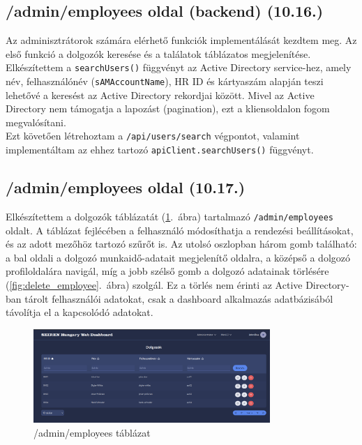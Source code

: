 \documentclass[a4paper]{article}
\newcommand{\inltxt}[1]{\texttt{#1}}
\begin{document}
\subsection{/admin/employees oldal (backend) (10.16.)}

Az adminisztrátorok számára elérhető funkciók implementálását kezdtem meg. Az első funkció a
dolgozók keresése és a találatok táblázatos megjelenítése. Elkészítettem a \inltxt{searchUsers()}
függvényt az Active Directory service-hez, amely név, felhasználónév (\inltxt{sAMAccountName}), HR ID és
kártyaszám alapján teszi lehetővé a keresést az Active Directory rekordjai között. Mivel az Active
Directory nem támogatja a lapozást (pagination), ezt a kliensoldalon fogom megvalósítani.\\

Ezt követően létrehoztam a \inltxt{/api/users/search} végpontot, valamint implementáltam az ehhez
tartozó \inltxt{apiClient.searchUsers()} függvényt.


\subsection{/admin/employees oldal (10.17.)}

Elkészítettem a dolgozók táblázatát (\ref{fig:employees}.~ábra) tartalmazó \inltxt{/admin/employees} oldalt. A táblázat fejlécében a
felhasználó módosíthatja a rendezési beállításokat, és az adott mezőhöz tartozó szűrőt is. Az utolsó
oszlopban három gomb található: a bal oldali a dolgozó munkaidő-adatait megjelenítő oldalra, a
középső a dolgozó profiloldalára navigál, míg a jobb szélső gomb a dolgozó adatainak törlésére (\ref{fig:delete_employee}.~ábra) szolgál.
Ez a törlés nem érinti az Active Directory-ban tárolt felhasználói adatokat, csak a dashboard alkalmazás
adatbázisából távolítja el a kapcsolódó adatokat.

\begin{figure}[ht]
  \centering
  \includegraphics[width = 0.8\textwidth]{images/employees.png}
  \caption{/admin/employees táblázat}
  \label{fig:employees}
\end{figure}
\end{document}
